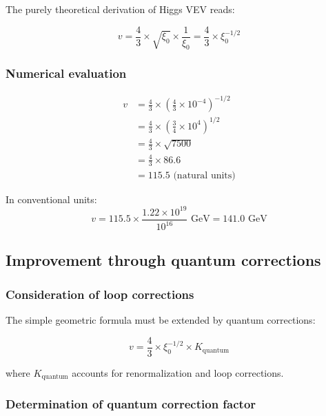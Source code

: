 \documentclass[12pt,a4paper]{article}
\begin{document}
The purely theoretical derivation of Higgs VEV reads:

\begin{equation}
	\boxed{v = \frac{4}{3} \times \sqrt{\xi_0} \times \frac{1}{\xi_0} = \frac{4}{3} \times \xi_0^{-1/2}}
\end{equation}

\subsubsection{Numerical evaluation}

\begin{align}
	v &= \frac{4}{3} \times \left(\frac{4}{3} \times 10^{-4}\right)^{-1/2}\\
	&= \frac{4}{3} \times \left(\frac{3}{4} \times 10^{4}\right)^{1/2}\\
	&= \frac{4}{3} \times \sqrt{7500}\\
	&= \frac{4}{3} \times 86.6\\
	&= 115.5 \text{ (natural units)}
\end{align}

In conventional units:
\begin{equation}
	v = 115.5 \times \frac{1.22 \times 10^{19}}{10^{16}} \text{ GeV} = 141.0 \text{ GeV}
\end{equation}

\subsection{Improvement through quantum corrections}

\subsubsection{Consideration of loop corrections}

The simple geometric formula must be extended by quantum corrections:

\begin{equation}
	v = \frac{4}{3} \times \xi_0^{-1/2} \times K_{\text{quantum}}
\end{equation}

where $K_{\text{quantum}}$ accounts for renormalization and loop corrections.

\subsubsection{Determination of quantum correction factor}
\end{document}
